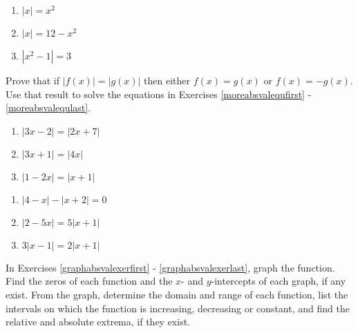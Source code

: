 {\begin{multicols}{3}
\begin{enumerate}
\setcounter{HW}{\value{enumi}}
\end{enumerate}
\end{multicols}


\begin{multicols}{3}
\begin{enumerate}
\setcounter{enumi}{\value{HW}}

\item  $|x| = x^2$
\item $|x| = 12 - x^2$
\item $|x^2 - 1| = 3$ \label{solveabsvalequlast}

\setcounter{HW}{\value{enumi}}
\end{enumerate}
\end{multicols}

Prove that if $|f(x)| = |g(x)|$ then either $f(x) = g(x)$ or $f(x) = -g(x)$. Use that result to solve the equations in Exercises \ref{moreabsvalequfirst} - \ref{moreabsvalequlast}.


\begin{multicols}{3}
\begin{enumerate}
\setcounter{enumi}{\value{HW}}

\item $|3x - 2| = |2x + 7|$  \label{moreabsvalequfirst}
\item $|3x+1| = |4x|$
\item $|1-2x| = |x+1|$

\setcounter{HW}{\value{enumi}}
\end{enumerate}
\end{multicols}


\begin{multicols}{3}
\begin{enumerate}
\setcounter{enumi}{\value{HW}}

\item  $|4-x| - |x+2| = 0$
\item $|2-5x| = 5 |x+1|$
\item $3|x-1| = 2|x+1|$ \label{moreabsvalequlast}


\setcounter{HW}{\value{enumi}}
\end{enumerate}
\end{multicols}



In Exercises \ref{graphabsvalexerfirst} - \ref{graphabsvalexerlast}, graph the function. Find the zeros of each function and the $x$- and $y$-intercepts of each graph, if any exist.  From the graph, determine the domain and range of each function, list the intervals on which the function is increasing, decreasing or constant, and find the relative and absolute extrema, if they exist.

}
